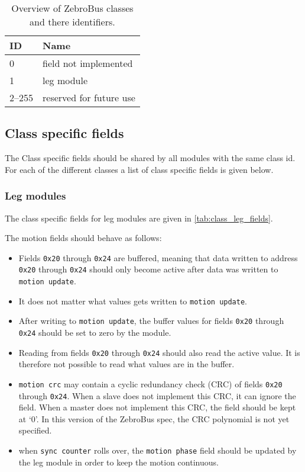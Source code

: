 \begin{table}[H]
    \begin{center}
    \caption{Overview of ZebroBus classes and there identifiers.}
    \label{tab:zebrobus_classes}
    \begin{tabular}{ll}
    \toprule
    ID & Name \\ \midrule
    0 & field not implemented \\
    1 & leg module \\
    2--255 & reserved for future use \\
    \bottomrule
    \end{tabular}
    \end{center}
\end{table}

\subsection{Class specific fields}\label{sec:class_specific_fields}
The Class specific fields should be shared by all modules with the same class id.
For each of the different classes a list of class specific fields is given below.
\subsubsection{Leg modules}
The class specific fields for leg modules are given in \cref{tab:class_leg_fields}.

The motion fields should behave as follows:
\begin{itemize}
    \item Fields \verb|0x20| through \verb|0x24| are buffered, meaning that
        data written to address \verb|0x20| through \verb|0x24| should only become active after data was written to \verb|motion update|.
    \item It does not matter what values gets written to \verb|motion update|.
    \item After writing to \verb|motion update|,
    the buffer values for fields \verb|0x20| through \verb|0x24| should be set to zero by the module.
    \item Reading from fields \verb|0x20| through \verb|0x24| should also read the active value.
    It is therefore not possible to read what values are in the buffer.
    \item \verb|motion crc| may contain a cyclic redundancy check (CRC) of fields \verb|0x20| through \verb|0x24|.
        When a slave does not implement this CRC, it can ignore the field.
        When a master does not implement this CRC, the field should be kept at `0'.
        In this version of the ZebroBus spec, the CRC polynomial is not yet specified.
    \item when \verb|sync counter| rolls over, the \verb|motion phase| field should be updated by the leg module in order to keep the motion continuous.
\end{itemize}

